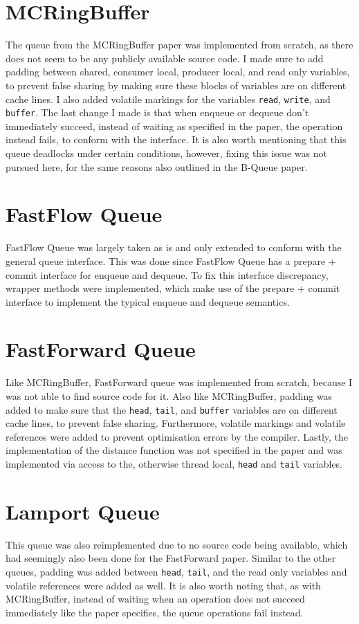 \section{MCRingBuffer}
The queue from the MCRingBuffer paper was implemented from scratch, as there does not seem to be any publicly
available source code\cite{MCRingBuffer}.
I made sure to add padding between shared, consumer local, producer local, and read only variables, to
prevent false sharing by making sure these blocks of variables are on different cache lines.
I also added volatile markings for the variables \texttt{read}, \texttt{write}, and \texttt{buffer}.
The last change I made is that when enqueue or dequeue don't immediately succeed, instead of waiting as
specified in the paper, the operation instead fails, to conform with the interface\cite{MCRingBuffer}.
It is also worth mentioning that this queue deadlocks under certain conditions, however, fixing this issue
was not pursued here, for the same reasons also outlined in the B-Queue paper\cite{B-Queue}.

\section{FastFlow Queue}
FastFlow Queue was largely taken as is and only extended to conform with the general queue
interface\cite{FastFlowGithub}.
This was done since FastFlow Queue has a prepare + commit interface for enqueue and dequeue.
To fix this interface discrepancy, wrapper methods were implemented, which make use of the prepare + commit
interface to implement the typical enqueue and dequeue semantics.

\section{FastForward Queue}
Like MCRingBuffer, FastForward queue was implemented from scratch, because I was not able to find source code
for it\cite{FastForward}.
Also like MCRingBuffer, padding was added to make sure that the \texttt{head}, \texttt{tail}, and
\texttt{buffer} variables are on different cache lines, to prevent false sharing.
Furthermore, volatile markings and volatile references were added to prevent optimisation errors by the compiler.
Lastly, the implementation of the distance function was not specified in the paper and was implemented via
access to the, otherwise thread local, \texttt{head} and \texttt{tail} variables.

\section{Lamport Queue}
This queue was also reimplemented due to no source code being available, which had seemingly also been done
for the FastForward paper.
Similar to the other queues, padding was added between \texttt{head}, \texttt{tail}, and the read only
variables and volatile references were added as well.
It is also worth noting that, as with MCRingBuffer, instead of waiting when an operation does not succeed
immediately like the paper specifies, the queue operations fail instead\cite{Lamport}.
